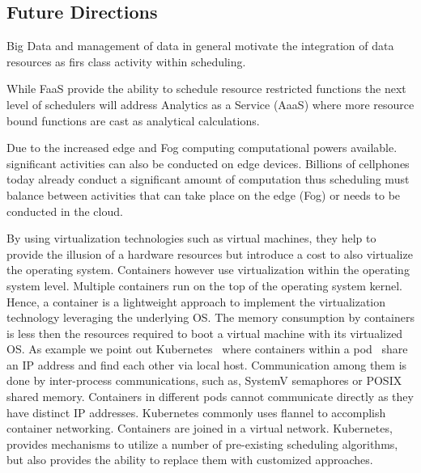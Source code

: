 \documentclass[final,5p,times,twocolumn]{elsarticle}
\begin{document}
\subsection{Future Directions}



\begin{description}

\color{red}
  
\item[Integration for data.] Big Data and management of data in
general motivate the integration of data resources as firs class
activity within scheduling.

\item[Analytics Services.] While FaaS provide the ability to schedule
resource restricted functions the next level of schedulers will
address Analytics as a Service (AaaS) where more resource bound
functions are cast as analytical calculations.
\item[Edge Computing and Fog computing.] Due to the increased edge and
Fog computing computational powers available. significant activities
can also be conducted on edge devices. Billions of cellphones today
already conduct a significant amount of computation thus scheduling
must balance between activities that can take place on the edge (Fog)
or needs to be conducted in the cloud.

\item[Scheduling Challenges Arising form use of Containers.] By using
  virtualization technologies such as virtual machines, they help to
  provide the illusion of a hardware resources but introduce a cost to
  also virtualize the operating system. Containers however use
  virtualization within the operating system level. Multiple
  containers run on the top of the operating system kernel. Hence, a
  container is a lightweight approach to implement the virtualization
  technology leveraging the underlying OS. The memory consumption by
  containers is less then the resources required to boot a virtual
  machine with its virtualized OS. As example we point out
  Kubernetes~\cite{Kuber2018} where containers within a
  pod~\cite{Kubernates2018} share an IP address and find each other
  via local host. Communication among them is done by inter-process
  communications, such as, SystemV semaphores or POSIX shared
  memory. Containers in different pods cannot communicate directly as
  they have distinct IP addresses. Kubernetes commonly uses flannel to
  accomplish container networking. Containers are joined in a virtual
  network. Kubernetes, provides mechanisms to utilize a number of
  pre-existing scheduling algorithms, but also provides the ability to
  replace them with customized approaches.


\end{description}
\end{document}
